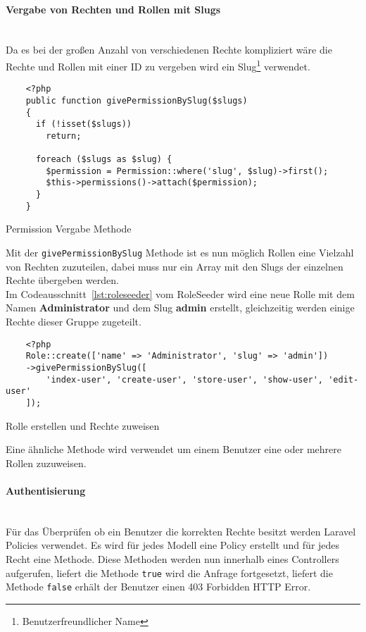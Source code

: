 \paragraph{Vergabe von Rechten und Rollen mit Slugs}\mbox{}\\
Da es bei der großen Anzahl von verschiedenen Rechte kompliziert wäre die Rechte
und Rollen mit einer ID zu vergeben wird ein Slug\footnote{Benutzerfreundlicher
Name} verwendet.

\begin{listing}[H]
  \begin{verbatim}
    <?php
    public function givePermissionBySlug($slugs)
    {
      if (!isset($slugs))
        return;

      foreach ($slugs as $slug) {
        $permission = Permission::where('slug', $slug)->first();
        $this->permissions()->attach($permission);
      }
    }
  \end{verbatim}
  \caption{Permission Vergabe Methode}
\end{listing}

Mit der \verb|givePermissionBySlug| Methode ist es nun möglich Rollen eine
Vielzahl von Rechten zuzuteilen, dabei muss nur ein Array mit den Slugs der
einzelnen Rechte übergeben werden.\\

Im Codeausschnitt~\ref{lst:roleseeder} vom RoleSeeder wird eine neue Rolle mit
dem Namen \textbf{Administrator} und dem Slug \textbf{admin} erstellt,
gleichzeitig werden einige Rechte dieser Gruppe zugeteilt.

\begin{listing}[H]
  \begin{verbatim}
    <?php
    Role::create(['name' => 'Administrator', 'slug' => 'admin'])
    ->givePermissionBySlug([
        'index-user', 'create-user', 'store-user', 'show-user', 'edit-user'
    ]);
  \end{verbatim}
  \caption{Rolle erstellen und Rechte zuweisen}
  \label{lst:roleseeder}
\end{listing}

Eine ähnliche Methode wird verwendet um einem Benutzer eine oder mehrere Rollen
zuzuweisen.

\paragraph{Authentisierung}\mbox{}\\
Für das Überprüfen ob ein Benutzer die korrekten Rechte besitzt werden Laravel
Policies verwendet. Es wird für jedes Modell eine Policy erstellt und für jedes
Recht eine Methode. Diese Methoden werden nun innerhalb eines Controllers
aufgerufen, liefert die Methode \verb|true| wird die Anfrage fortgesetzt,
liefert die Methode \verb|false| erhält der Benutzer einen 403 Forbidden HTTP Error.

